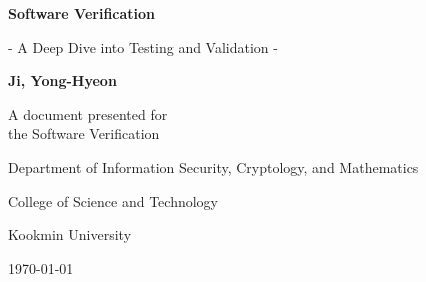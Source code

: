 \begin{titlepage}
    \centering
    
    \vspace*{1cm}
    
    \Huge\textsf{\textbf{Software Verification}}
    
    \vspace{0.5cm}
    \LARGE\textsf{- A Deep Dive into Testing and Validation -}
    
    \vspace{1.5cm}
    \textbf{Ji, Yong-Hyeon}

    \vfill
    A document presented for\\
    the Software Verification
    
    \vspace{0.8cm}
    {\large\textsf{Department of Information Security, Cryptology, and Mathematics}\par}
    {\large\textsf{College of Science and Technology}\par}
    {\large\textsf{Kookmin University}\par}
    \vspace{.25in}
    {\large \textsf{\today}\par}
    
\end{titlepage}

